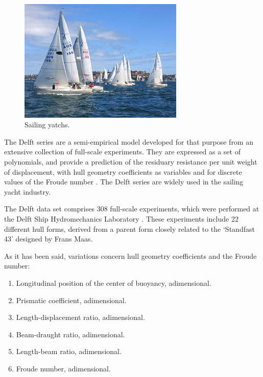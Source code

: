 \begin{figure}[!hbp]
\begin{center}
\includegraphics[width=0.7\textwidth]{function_regression/sailing_yatchs.jpg}
\caption{Sailing yatchs.}\label{SailingYatchsFigure}
\end{center}
\end{figure}

The Delft series are a semi-empirical model developed for that
purpose from an extensive collection of full-scale experiments. They
are expressed as a set of polynomials, and provide a prediction of
the residuary resistance per unit weight of displacement, with hull
geometry coefficients as variables and for discrete values of the
Froude number \cite{Gerritsma1981}. The Delft series are widely used
in the sailing yacht industry.

The Delft data set comprises 308 full-scale experiments, which were
performed at the Delft Ship Hydromechanics Laboratory
\cite{Gerritsma1981}. These experiments include 22 different hull
forms, derived from a parent form closely related to the `Standfast
43' designed by Frans Maas. 

As it has been said, variations concern hull geometry coefficients and the
Froude number:

\begin{enumerate}
\item Longitudinal position of the center of buoyancy, adimensional.
\item Prismatic coefficient, adimensional.
\item Length-displacement ratio, adimensional.
\item Beam-draught ratio, adimensional.
\item Length-beam ratio, adimensional.
\item Froude number, adimensional.
\end{enumerate}

